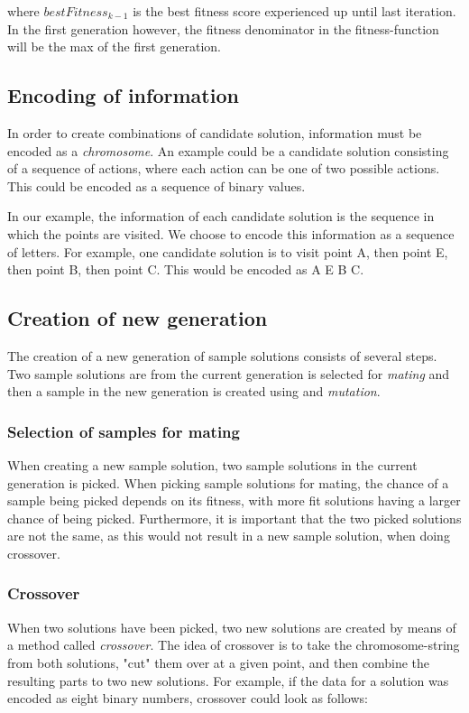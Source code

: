 where $bestFitness_{k-1}$ is the best fitness score experienced up until last iteration. In the first generation however, the fitness denominator in the fitness-function will be the max of the first generation.

\subsection{Encoding of information}
In order to create combinations of candidate solution, information must be encoded as a \textit{chromosome}. An example could be a candidate solution consisting of a sequence of actions, where each action can be one of two possible actions. This could be encoded as a sequence of binary values.

In our example, the information of each candidate solution is the sequence in which the points are visited. We choose to encode this information as a sequence of letters. For example, one candidate solution is to visit point A, then point E, then point B, then point C. This would be encoded as
A E B C.

\subsection{Creation of new generation}
The creation of a new generation of sample solutions consists of several steps. Two sample solutions are from the current generation is selected for \textit{mating} and then a sample in the new generation is created using  and \textit{mutation}.

\subsubsection{Selection of samples for mating}
When creating a new sample solution, two sample solutions in the current generation is picked. When picking sample solutions for mating, the chance of a sample being picked depends on its fitness, with more fit solutions having a larger chance of being picked. Furthermore, it is important that the two picked solutions are not the same, as this would not result in a new sample solution, when doing crossover.

\subsubsection{Crossover}
When two solutions have been picked, two new solutions are created by means of a method called \textit{crossover}. The idea of crossover is to take the chromosome-string from both solutions, "cut" them over at a given point, and then combine the resulting parts to two new solutions. For example, if the data for a solution was encoded as eight binary numbers, crossover could look as follows:

